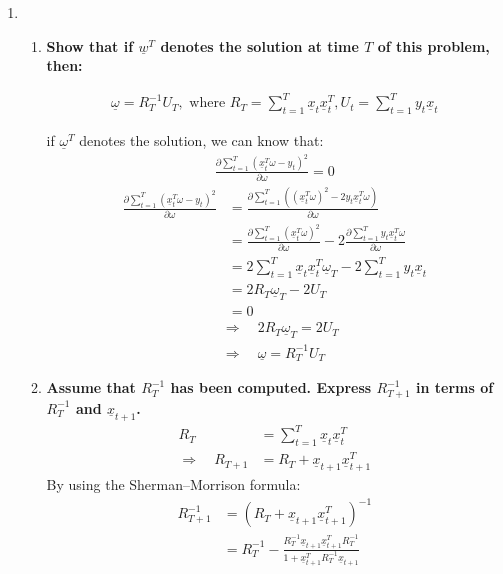 \documentclass[11pt,letterpaper]{article}
\begin{document}
\begin{enumerate}
\item 
\begin{enumerate}
    \item 
    \textbf{Show that if $\underline w^T$ denotes the solution at time $T$ of this problem, then:}
    \begin{flushleft}
        \justifying
        \begin{align*}
            \underline\omega = R_T^{-1}U_T, \text{ where } R_T = \sum_{t=1}^T \underline x_t \underline x_t^T, U_t = \sum_{t=1}^Ty_t \underline x_t
        \end{align*}
    \end{flushleft}
    if $\underline \omega^T$ denotes the solution, we can know that:
    \begin{align*}
        \frac{\partial \sum_{t=1}^T (\underline x_t^T \omega - y_t)^2}{\partial \omega} = 0
    \end{align*}
    \begin{align*}
        \frac{\partial \sum_{t=1}^T (\underline x_t^T \omega - y_t)^2}{\partial \omega} &= \frac{\partial \sum_{t=1}^T ((\underline x_t^T \omega)^2 - 2y_t \underline x_t^T\omega) }{\partial \omega} \\
        &= \frac{\partial \sum_{t=1}^T (\underline x_t^T \omega)^2 }{\partial \omega}
        - 2\frac{\partial \sum_{t=1}^T  y_t \underline x_t^T\omega }{\partial \omega}\\
        &= 2\sum_{t=1}^T \underline x_t \underline x_t^T \underline \omega_T - 2\sum_{t=1}^Ty_t \underline x_t \\
        &= 2R_T\underline \omega_T - 2U_T\\
        &=0
    \end{align*}
    \begin{align*}
        &\Rightarrow \quad 2R_T\underline \omega_T = 2U_T\\
        &\Rightarrow \quad \underline\omega = R_T^{-1}U_T
    \end{align*}

    \item 
    \textbf{Assume that $R_T^{-1}$ has been computed. Express $R_{T+1}^{-1}$ in terms of $R_T^{-1}$ and $\underline x_{t+1}$.}
    \begin{align*}
        R_T &= \sum_{t=1}^T \underline x_t \underline x_t^T \\
        \Rightarrow \quad R_{T+1} &= R_T + \underline x_{t+1} \underline x_{t+1}^T
    \end{align*}
    By using the Sherman–Morrison formula:
    \begin{align*}
         R_{T+1}^{-1} &= (R_T + \underline x_{t+1} \underline x_{t+1}^T)^{-1} \\
         &= R_{T}^{-1} - \frac{R_{T}^{-1} \underline x_{t+1} \underline x_{t+1}^T R_{T}^{-1} }
         {1 +  \underline x_{t+1}^T R_{T}^{-1} \underline x_{t+1}}
    \end{align*}


\end{enumerate}
\end{enumerate}
\end{document}
